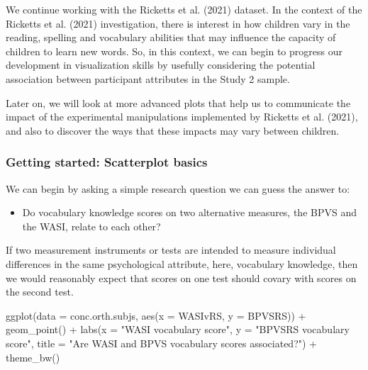 \documentclass[
  letterpaper,
  DIV=11,
  numbers=noendperiod]{scrreprt}
\newenvironment{Shaded}{\begin{snugshade}}{\end{snugshade}}
\newcommand{\AttributeTok}[1]{\textcolor[rgb]{0.40,0.45,0.13}{#1}}
\newcommand{\FunctionTok}[1]{\textcolor[rgb]{0.28,0.35,0.67}{#1}}
\newcommand{\NormalTok}[1]{\textcolor[rgb]{0.00,0.23,0.31}{#1}}
\newcommand{\SpecialCharTok}[1]{\textcolor[rgb]{0.37,0.37,0.37}{#1}}
\newcommand{\StringTok}[1]{\textcolor[rgb]{0.13,0.47,0.30}{#1}}
\providecommand{\tightlist}{%
  \setlength{\itemsep}{0pt}\setlength{\parskip}{0pt}}\usepackage{longtable,booktabs,array}
\begin{document}
We continue working with the Ricketts et al. (2021) dataset. In the
context of the Ricketts et al. (2021) investigation, there is interest
in how children vary in the reading, spelling and vocabulary abilities
that may influence the capacity of children to learn new words. So, in
this context, we can begin to progress our development in visualization
skills by usefully considering the potential association between
participant attributes in the Study 2 sample.

Later on, we will look at more advanced plots that help us to
communicate the impact of the experimental manipulations implemented by
Ricketts et al. (2021), and also to discover the ways that these impacts
may vary between children.

\hypertarget{sec-scatter-basics}{%
\subsubsection{Getting started: Scatterplot
basics}\label{sec-scatter-basics}}

We can begin by asking a simple research question we can guess the
answer to:

\begin{itemize}
\tightlist
\item
  Do vocabulary knowledge scores on two alternative measures, the BPVS
  and the WASI, relate to each other?
\end{itemize}

If two measurement instruments or tests are intended to measure
individual differences in the same psychological attribute, here,
vocabulary knowledge, then we would reasonably expect that scores on one
test should covary with scores on the second test.

\begin{Shaded}
\begin{Highlighting}[numbers=left,,]
\FunctionTok{ggplot}\NormalTok{(}\AttributeTok{data =}\NormalTok{ conc.orth.subjs, }\FunctionTok{aes}\NormalTok{(}\AttributeTok{x =}\NormalTok{ WASIvRS, }\AttributeTok{y =}\NormalTok{ BPVSRS)) }\SpecialCharTok{+}
  \FunctionTok{geom\_point}\NormalTok{() }\SpecialCharTok{+}
  \FunctionTok{labs}\NormalTok{(}\AttributeTok{x =} \StringTok{"WASI vocabulary score"}\NormalTok{, }
       \AttributeTok{y =} \StringTok{"BPVSRS vocabulary score"}\NormalTok{,}
       \AttributeTok{title =} \StringTok{"Are WASI and BPVS vocabulary scores associated?"}\NormalTok{) }\SpecialCharTok{+}
  \FunctionTok{theme\_bw}\NormalTok{()}
\end{Highlighting}
\end{Shaded}
\end{document}

